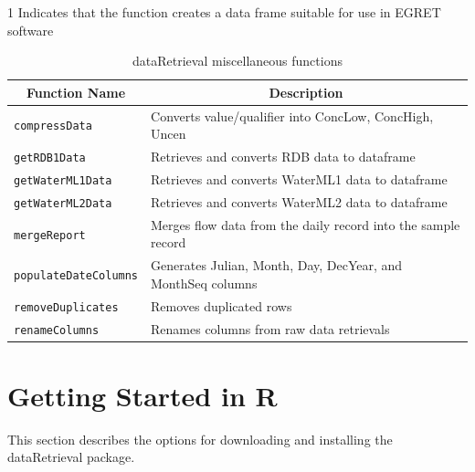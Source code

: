 \documentclass[a4paper,11pt]{article}\usepackage[]{graphicx}\usepackage[]{color}
\begin{document}
\begin{table}
{\begin{threeparttable}[b]
  \begin{tablenotes}
    \item[1] Indicates that the function creates a data frame suitable for use in EGRET software
  \end{tablenotes}
 \end{threeparttable}
}
\end{table}


\begin{table}[!ht]
\begin{minipage}{\linewidth}
{\footnotesize
\caption{dataRetrieval miscellaneous functions} 
\label{tab:dataRetrievalMisc}
\begin{tabular}{ll}
  \hline
\multicolumn{1}{c}{\textbf{\textsf{Function Name}}} &
\multicolumn{1}{c}{\textbf{\textsf{Description}}} \\  [0pt]
  \hline
  \texttt{compressData} &  Converts value/qualifier into ConcLow, ConcHigh, Uncen\\
  [5pt]\texttt{getRDB1Data} & Retrieves and converts RDB data to dataframe\\
  [5pt]\texttt{getWaterML1Data} & Retrieves and converts WaterML1 data to dataframe\\
  [5pt]\texttt{getWaterML2Data} & Retrieves and converts WaterML2 data to dataframe\\
  [5pt]\texttt{mergeReport} & Merges flow data from the daily record into the sample record\\
  [5pt]\texttt{populateDateColumns} & Generates Julian, Month, Day, DecYear, and MonthSeq columns\\
  [5pt]\texttt{removeDuplicates} & Removes duplicated rows\\
  [5pt]\texttt{renameColumns} & Renames columns from raw data retrievals\\
   \hline
\end{tabular}
}
\end{minipage}
\end{table}

\FloatBarrier
\clearpage


\section{Getting Started in R}
\label{sec:appendix1}
This section describes the options for downloading and installing the dataRetrieval package.
\end{document}
